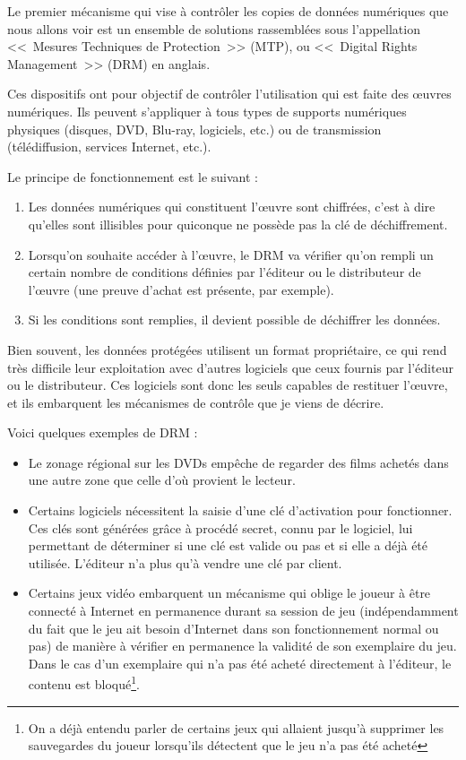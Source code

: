 Le premier mécanisme qui vise à contrôler les copies de données numériques que nous allons voir est un ensemble de solutions rassemblées sous l'appellation <<~Mesures Techniques de Protection~>> (MTP), ou <<~Digital Rights Management~>> (DRM) en anglais.

Ces dispositifs ont pour objectif de contrôler l'utilisation qui est faite des œuvres numériques.
Ils peuvent s'appliquer à tous types de supports numériques physiques (disques, DVD, Blu-ray, logiciels, etc.) ou de transmission (télédiffusion, services Internet, etc.).

Le principe de fonctionnement est le suivant :

\begin{enumerate}
\item Les données numériques qui constituent l'œuvre sont chiffrées, c'est à dire qu'elles sont illisibles pour quiconque ne possède pas la clé de déchiffrement.
\item Lorsqu'on souhaite accéder à l'œuvre, le DRM va vérifier qu'on rempli un certain nombre de conditions définies par l'éditeur ou le distributeur de l'œuvre (une preuve d'achat est présente, par exemple).
\item Si les conditions sont remplies, il devient possible de déchiffrer les données.
\end{enumerate}

Bien souvent, les données protégées utilisent un format propriétaire, ce qui rend très difficile leur exploitation avec d'autres logiciels que ceux fournis par l'éditeur ou le distributeur.
Ces logiciels sont donc les seuls capables de restituer l'œuvre, et ils embarquent les mécanismes de contrôle que je viens de décrire.

Voici quelques exemples de DRM :

\begin{itemize}
\item  Le zonage régional sur les DVDs empêche de regarder des films achetés dans une autre zone que celle d'où provient le lecteur.
\item Certains logiciels nécessitent la saisie d'une clé d'activation pour fonctionner.
Ces clés sont générées grâce à procédé secret, connu par le logiciel, lui permettant de déterminer si une clé est valide ou pas et si elle a déjà été utilisée.
L'éditeur n'a plus qu'à vendre une clé par client.
\item Certains jeux vidéo embarquent un mécanisme qui oblige le joueur à être connecté à Internet en permanence durant sa session de jeu (indépendamment du fait que le jeu ait besoin d'Internet dans son fonctionnement normal ou pas) de manière à vérifier en permanence la validité de son exemplaire du jeu.
Dans le cas d'un exemplaire qui n'a pas été acheté directement à l'éditeur, le contenu est bloqué\footnote{On a déjà entendu parler de certains jeux qui allaient jusqu'à supprimer les sauvegardes du joueur lorsqu'ils détectent que le jeu n'a pas été acheté}.
\end{itemize}

